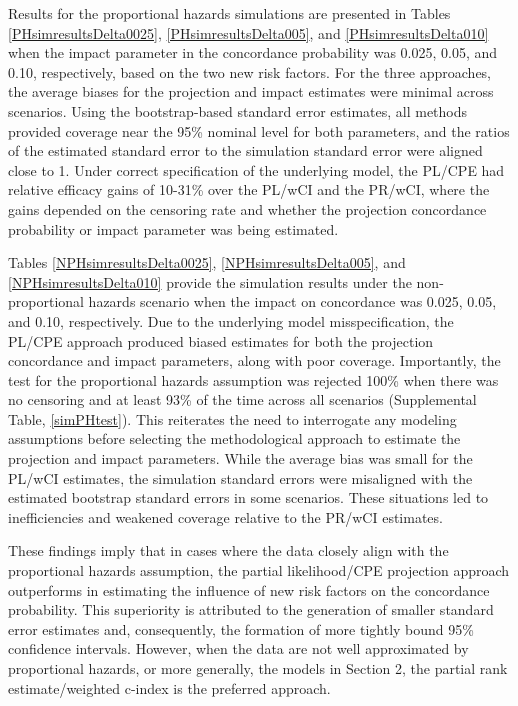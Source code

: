 \documentclass[12pt]{article}
\begin{document}
Results for the proportional hazards simulations are presented in Tables \ref{PHsimresultsDelta0025}, \ref{PHsimresultsDelta005}, and \ref{PHsimresultsDelta010} when the impact parameter in the concordance probability was 0.025, 0.05, and 0.10, respectively, based on the two new risk factors. For the three approaches, the average biases for the projection and impact estimates were minimal across scenarios. Using the bootstrap-based standard error estimates, all methods provided coverage near the 95\% nominal level for both parameters, and the ratios of the estimated standard error to the simulation standard error were aligned close to 1. Under correct specification of the underlying model, the PL/CPE had relative efficacy gains of 10-31\% over the PL/wCI and the PR/wCI, where the gains depended on the censoring rate and whether the projection concordance probability or impact parameter was being estimated. 

Tables \ref{NPHsimresultsDelta0025}, \ref{NPHsimresultsDelta005}, and \ref{NPHsimresultsDelta010} provide the simulation results under the non-proportional hazards scenario when the impact on concordance was 0.025, 0.05, and 0.10, respectively. Due to the underlying model misspecification, the PL/CPE approach produced biased estimates for both the projection concordance and impact parameters, along with poor coverage. Importantly, the test for the proportional hazards assumption \citep{Grambsch1994} was rejected 100\% when there was no censoring and at least 93\% of the time across all scenarios (Supplemental Table, \ref{simPHtest}).  This reiterates the need to interrogate any modeling assumptions before selecting the methodological approach to estimate the projection and impact parameters. While the average bias was small for the PL/wCI estimates, the simulation standard errors were misaligned with the estimated bootstrap standard errors in some scenarios. These situations led to inefficiencies and weakened coverage relative to the PR/wCI estimates.

These findings imply that in cases where the data closely align with the proportional hazards assumption, the partial likelihood/CPE projection approach outperforms in estimating the influence of new risk factors on the concordance probability. This superiority is attributed to the generation of smaller standard error estimates and, consequently, the formation of more tightly bound 95\% confidence intervals.  However, when the data are not well approximated by  proportional hazards, or more generally, the models in Section 2, the partial rank estimate/weighted c-index is the preferred approach. 
\end{document}
